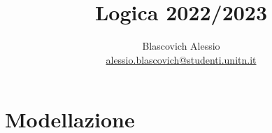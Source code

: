 \documentclass{book}
\title{Logica 2022/2023}
\author{Blascovich Alessio\\
    \href{mailto:alessio.blascovich@studenti.unitn.it}{alessio.blascovich@studenti.unitn.it}}
\date{}
\begin{document}
    \maketitle
    \tableofcontents
    \part{Modellazione}
    
\end{document}
